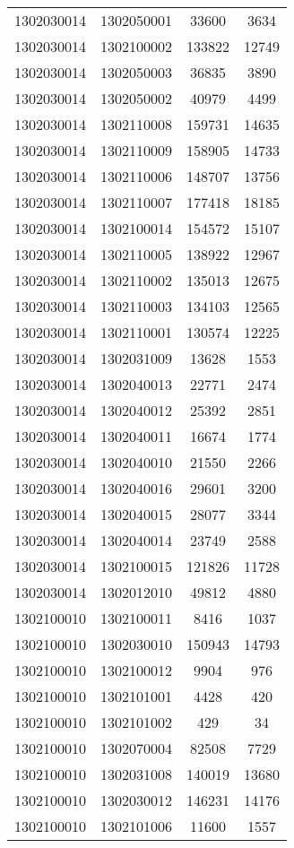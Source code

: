 \begin{longtable}[h]{llcc}
		1302030014 & 1302050001 & 33600 & 3634\\
		1302030014 & 1302100002 & 133822 & 12749\\
		1302030014 & 1302050003 & 36835 & 3890\\
		1302030014 & 1302050002 & 40979 & 4499\\
		1302030014 & 1302110008 & 159731 & 14635\\
		1302030014 & 1302110009 & 158905 & 14733\\
		1302030014 & 1302110006 & 148707 & 13756\\
		1302030014 & 1302110007 & 177418 & 18185\\
		1302030014 & 1302100014 & 154572 & 15107\\
		1302030014 & 1302110005 & 138922 & 12967\\
		1302030014 & 1302110002 & 135013 & 12675\\
		1302030014 & 1302110003 & 134103 & 12565\\
		1302030014 & 1302110001 & 130574 & 12225\\
		1302030014 & 1302031009 & 13628 & 1553\\
		1302030014 & 1302040013 & 22771 & 2474\\
		1302030014 & 1302040012 & 25392 & 2851\\
		1302030014 & 1302040011 & 16674 & 1774\\
		1302030014 & 1302040010 & 21550 & 2266\\
		1302030014 & 1302040016 & 29601 & 3200\\
		1302030014 & 1302040015 & 28077 & 3344\\
		1302030014 & 1302040014 & 23749 & 2588\\
		1302030014 & 1302100015 & 121826 & 11728\\
		1302030014 & 1302012010 & 49812 & 4880\\
		1302100010 & 1302100011 & 8416 & 1037\\
		1302100010 & 1302030010 & 150943 & 14793\\
		1302100010 & 1302100012 & 9904 & 976\\
		1302100010 & 1302101001 & 4428 & 420\\
		1302100010 & 1302101002 & 429 & 34\\
		1302100010 & 1302070004 & 82508 & 7729\\
		1302100010 & 1302031008 & 140019 & 13680\\
		1302100010 & 1302030012 & 146231 & 14176\\
		1302100010 & 1302101006 & 11600 & 1557\\

\end{longtable}
